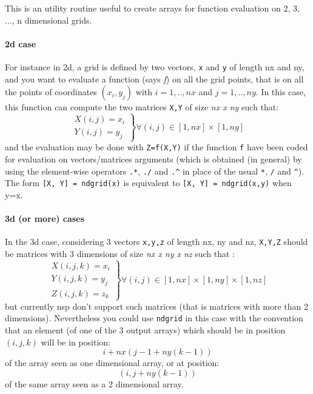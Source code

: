 \begin{mandescription}
 This is an utility routine useful to create arrays for function evaluation on 2, 3, ..., n 
dimensional grids. 

\paragraph{2d case}
For instance in 2d, a grid is defined by two vectors, \verb!x! and
\verb!y! of length nx and ny, and you want to evaluate a function (says {\em f}) 
on all the grid points, that is on all the points of coordinates  $(x_i, y_j)$ 
with  $i=1,..,nx$ and $j=1,..,ny$. In this case, this function can
compute the two matrices \verb!X,Y! of size {\em nx x ny} such that:
$$\left.
  \begin{array}{r} X(i,j) = x_i \\
                   Y(i,j) = y_j
  \end{array} 
  \right\} \forall (i,j) \in  [1,nx] \times [1,ny]
$$
and the evaluation may be done with \verb!Z=f(X,Y)! if the function \verb!f! have
been coded  for evaluation on vectors/matrices arguments (which is obtained (in general) 
by using the element-wise operators \verb!.*!, \verb!./! and \verb!.^! in place of the
usual \verb!*!, \verb!/! and \verb!^!). The form \verb+[X, Y] = ndgrid(x)+ is equivalent 
to \verb+[X, Y] = ndgrid(x,y)+ when y=x.    

\paragraph{3d (or more) cases}
In the 3d case, considering 3 vectors \verb!x,y,z! of length nx, ny and nz,  \verb!X,Y,Z!
should be matrices with 3 dimensions of size {\em nx x ny x nz} such that :
$$\left.
\begin{array}{r}
      X(i,j,k) = x_i  \\
      Y(i,j,k) = y_j  \\
      Z(i,j,k) = z_k  
\end{array} \right\} \forall (i,j) \in  [1,nx] \times [1,ny] \times [1,nz]
$$     
but currently nsp don't support such matrices (that is matrices with more than 2 dimensions). 
Nevertheless you could use \verb+ndgrid+ in this case with the convention that an element
(of one of the 3 output arrays) which should be in position $(i,j,k)$ will be in position:
$$
i + nx(j-1 + ny(k-1))
$$
of the array seen as one dimensional array, or at position:
$$
(i , j + ny(k-1))
$$
of the same array seen as a 2 dimensional array.
\end{mandescription}


